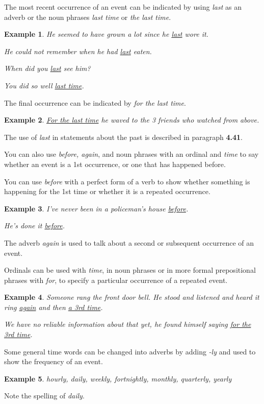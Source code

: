 \documentclass[oneside]{book}
\numberwithin{equation}{section}
\newtheorem{example}{Example}[section]
\begin{document}
%
The most recent occurrence of an event can be indicated by using \textit{last} as an adverb or the noun phrases \textit{last time} or \textit{the last time}.
\begin{example}
    He seemed to have grown a lot since he \underline{last} wore it.
    
    He could not remember when he had \underline{last} eaten.
    
    When did you \underline{last} see him?
    
    You did so well \underline{last time}.
\end{example}
The final occurrence can be indicated by \textit{for the last time}.
\begin{example}
    \underline{For the last time} he waved to the 3 friends who watched from above.
\end{example}
The use of \textit{last} in statements about the past is described in paragraph \textbf{4.41}.

%
You can also use \textit{before, again}, and noun phrases with an ordinal and \textit{time} to say whether an event is a 1st occurrence, or one that has happened before.

%
You can use \textit{before} with a perfect form of a verb to show whether something is happening for the 1st time or whether it is a repeated occurrence.
\begin{example}
    I've never been in a policeman's house \underline{before}.
    
    He's done it \underline{before}.
\end{example}
The adverb \textit{again} is used to talk about a second or subsequent occurrence of an event.

Ordinals can be used with \textit{time}, in noun phrases or in more formal prepositional phrases with \textit{for}, to specify a particular occurrence of a repeated event.
\begin{example}
    Someone rang the front door bell. He stood and listened and heard it ring \underline{again} and then \underline{a 3rd time}.
    
    We have no reliable information about that yet, he found himself saying \underline{for the 3rd time}.
\end{example}
%
\noindent{} Some general time words can be changed into adverbs by adding \textit{-ly} and used to show the frequency of an event.
\begin{example}
    hourly, daily, weekly, fortnightly, monthly, quarterly, yearly
\end{example}
Note the spelling of \textit{daily}.
\end{document}
